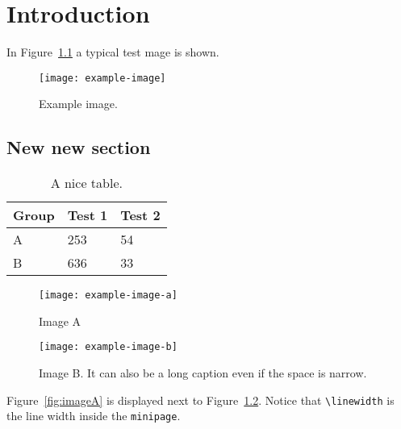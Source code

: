 
\chapter[Introduction]{Introduction}


In Figure~\ref{fig:testfig} a typical test mage is shown.
\begin{figure}[htbp]
  \centering
  \texttt{[image: example-image]}
  \caption{Example image.}
  \label{fig:testfig}
\end{figure}



\section{New new section}
\begin{table}[htbp]
  \centering
  \begin{tabular}{lll}
    Group & Test 1 & Test 2\\\hline
    A & 253 &54\\
    B & 636 & 33
  \end{tabular}
  \caption{A nice table.}
  \label{tab:tabletest}
\end{table}




\begin{figure}[htbp]
  \begin{minipage}[t]{0.5\linewidth}
    \centering
    \texttt{[image: example-image-a]}
    \caption{Image A}
    \label{fig:imageA}
  \end{minipage}%
  \begin{minipage}[t]{0.5\linewidth}
    \centering
    \texttt{[image: example-image-b]}
    \caption{Image B. It can also be a long caption even if the space is narrow.}
    \label{fig:imageB}
  \end{minipage}
\end{figure}

Figure~\ref{fig:imageA} is displayed next to Figure~\ref{fig:imageB}. Notice that \verb|\linewidth| is the line width inside the \verb|minipage|.




